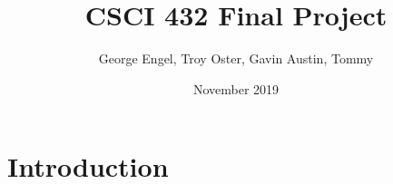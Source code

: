 \documentclass{article}
\title{CSCI 432 Final Project}
\author{George Engel, Troy Oster, Gavin Austin, Tommy}
\date{November 2019}
\begin{document}
\maketitle

\section{Introduction}
\end{document}
